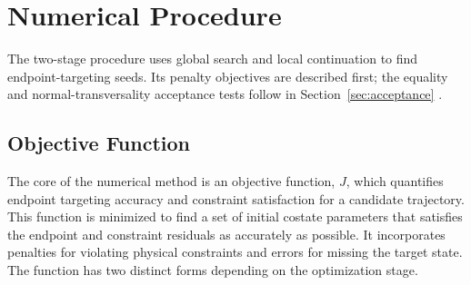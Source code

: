 \documentclass[journal,a4paper]{IEEEtran}
\begin{document}
\bigskip
\section{Numerical Procedure}
The two-stage procedure uses global search and local continuation to find endpoint-targeting seeds. Its penalty objectives are described first; the equality and normal-transversality acceptance tests follow in Section~\ref{sec:acceptance} \cite{Fogel2020,DiPasquale2024}.

\subsection{Objective Function}
The core of the numerical method is an objective function, \(J\), which quantifies endpoint targeting accuracy and constraint satisfaction for a candidate trajectory. This function is minimized to find a set of initial costate parameters that satisfies the endpoint and constraint residuals as accurately as possible. It incorporates penalties for violating physical constraints and errors for missing the target state. The function has two distinct forms depending on the optimization stage.
\end{document}
